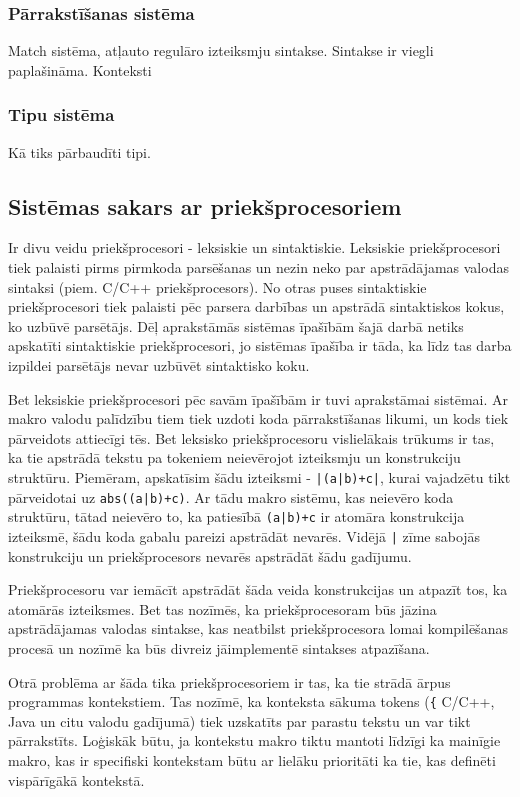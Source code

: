 \subsubsection{Pārrakstīšanas sistēma}
Match sistēma, atļauto regulāro izteiksmju sintakse. Sintakse ir viegli paplašināma.
Konteksti
\subsubsection{Tipu sistēma}
Kā tiks pārbaudīti tipi.

\subsection{Sistēmas sakars ar priekšprocesoriem}
Ir divu veidu priekšprocesori - leksiskie un sintaktiskie. Leksiskie priekšprocesori tiek palaisti pirms pirmkoda parsēšanas un nezin neko par apstrādājamas valodas sintaksi (piem. C/C++ priekšprocesors). No otras puses sintaktiskie priekšprocesori tiek palaisti pēc parsera darbības un apstrādā sintaktiskos kokus, ko uzbūvē parsētājs. Dēļ aprakstāmās sistēmas īpašībām šajā darbā netiks apskatīti sintaktiskie priekšprocesori, jo sistēmas īpašība ir tāda, ka līdz tas darba izpildei parsētājs nevar uzbūvēt sintaktisko koku.

Bet leksiskie priekšprocesori pēc savām īpašībām ir tuvi aprakstāmai sistēmai. Ar makro valodu palīdzību tiem tiek uzdoti koda pārrakstīšanas likumi, un kods tiek pārveidots attiecīgi tēs. Bet leksisko priekšprocesoru vislielākais trūkums ir tas, ka tie apstrādā tekstu pa tokeniem neievērojot izteiksmju un konstrukciju struktūru. Piemēram, apskatīsim šādu izteiksmi - \verb/|(a|b)+c|/, kurai vajadzētu tikt pārveidotai uz \verb/abs((a|b)+c)/. Ar tādu makro sistēmu, kas neievēro koda struktūru, tātad neievēro to, ka patiesībā \verb/(a|b)+c/ ir atomāra konstrukcija izteiksmē, šādu koda gabalu pareizi apstrādāt nevarēs. Vidējā \verb/|/ zīme sabojās konstrukciju un priekšprocesors nevarēs apstrādāt šādu gadījumu.

Priekšprocesoru var iemācīt apstrādāt šāda veida konstrukcijas un atpazīt tos, ka atomārās izteiksmes. Bet tas nozīmēs, ka priekšprocesoram būs jāzina apstrādājamas valodas sintakse, kas neatbilst priekšprocesora lomai kompilēšanas procesā un nozīmē ka būs divreiz jāimplementē sintakses atpazīšana.

Otrā problēma ar šāda tika priekšprocesoriem ir tas, ka tie strādā ārpus programmas kontekstiem. Tas nozīmē, ka konteksta sākuma tokens (\verb|{| C/C++, Java un citu valodu gadījumā) tiek uzskatīts par parastu tekstu un var tikt pārrakstīts. Loģiskāk būtu, ja kontekstu makro tiktu mantoti līdzīgi ka mainīgie  makro, kas ir specifiski kontekstam būtu ar lielāku prioritāti ka tie, kas definēti vispārīgākā kontekstā. 